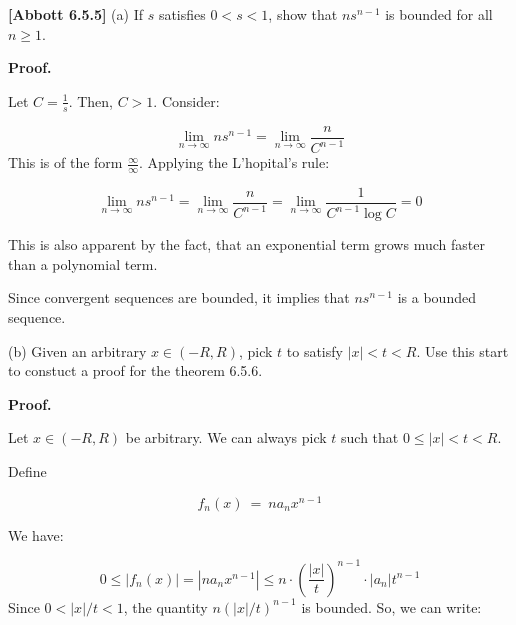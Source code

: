 \documentclass[10pt]{article}
\begin{document}
\textbf{[Abbott 6.5.5]} (a) If $\displaystyle s$ satisfies $\displaystyle 0< s< 1$, show that $\displaystyle ns^{n-1}$ is bounded for all $\displaystyle n\geq 1$. 



\textbf{Proof.}



Let $\displaystyle C=\frac{1}{s}$. Then, $\displaystyle C >1$. Consider:


\begin{equation*}
\lim _{n\rightarrow \infty } ns^{n-1} =\lim _{n\rightarrow \infty }\frac{n}{C^{n-1}}
\end{equation*}
This is of the form $\displaystyle \frac{\infty }{\infty }$. Applying the L'hopital's rule:


\begin{equation*}
\lim _{n\rightarrow \infty } ns^{n-1} =\lim _{n\rightarrow \infty }\frac{n}{C^{n-1}} =\lim _{n\rightarrow \infty }\frac{1}{C^{n-1}\log C} =0
\end{equation*}


This is also apparent by the fact, that an exponential term grows much faster than a polynomial term. 



Since convergent sequences are bounded, it implies that $\displaystyle ns^{n-1}$ is a bounded sequence.



(b) Given an arbitrary $\displaystyle x\in ( -R,R)$, pick $\displaystyle t$ to satisfy $\displaystyle |x|< t< R$. Use this start to constuct a proof for the theorem 6.5.6.



\textbf{Proof.} 



Let $\displaystyle x\in ( -R,R)$ be arbitrary. We can always pick $\displaystyle t$ such that $\displaystyle 0\leq |x |< t< R$. 



Define 


\begin{equation*}
f_{n}( x) \ =\ na_{n} x^{n-1}
\end{equation*}


We have:


\begin{equation*}
0\leq |f_{n}( x) |=|na_{n} x^{n-1} |\leq n\cdot \left(\frac{|x|}{t}\right)^{n-1} \cdot |a_{n} |t^{n-1}
\end{equation*}
Since $\displaystyle 0< |x|/t< 1$, the quantity $\displaystyle n( |x|/t)^{n-1}$ is bounded. So, we can write:
\end{document}
